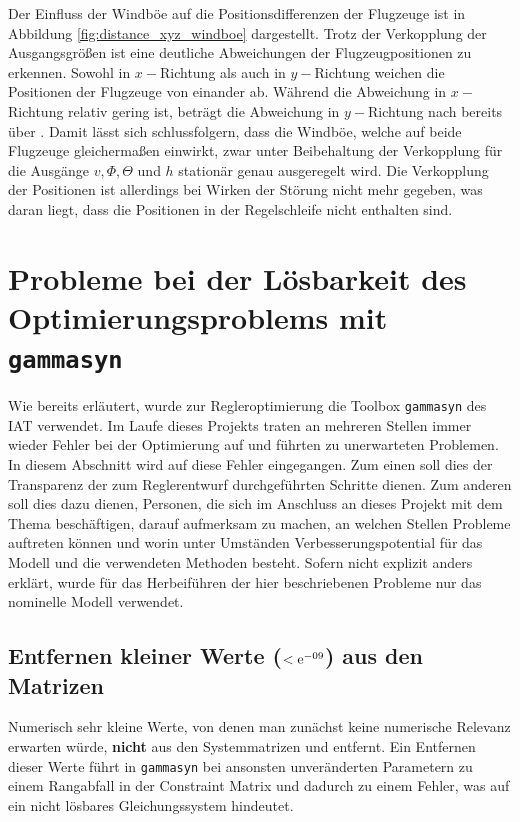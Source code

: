 Der Einfluss der Windböe auf die Positionsdifferenzen der Flugzeuge ist in Abbildung \ref{fig:distance_xyz_windboe} dargestellt. Trotz der Verkopplung der Ausgangsgrößen ist eine deutliche Abweichungen der Flugzeugpositionen zu erkennen. Sowohl in $x-$Richtung als auch in $y-$Richtung weichen die Positionen der Flugzeuge von einander ab. Während die Abweichung in $x-$Richtung relativ gering ist, beträgt die Abweichung in $y-$Richtung nach  bereits über . Damit lässt sich schlussfolgern, dass die Windböe, welche auf beide Flugzeuge gleichermaßen einwirkt, zwar unter Beibehaltung der Verkopplung für die Ausgänge $v, \Phi, \Theta$ und $h$ stationär genau ausgeregelt wird. Die Verkopplung der Positionen ist allerdings bei Wirken der Störung nicht mehr gegeben, was daran liegt, dass die Positionen in der Regelschleife nicht enthalten sind.

\section{Probleme bei der Lösbarkeit des Optimierungsproblems mit \texttt{gammasyn}}
Wie bereits erläutert, wurde zur Regleroptimierung die \Matlab Toolbox \texttt{gammasyn} des IAT verwendet. Im Laufe dieses Projekts traten an mehreren Stellen immer wieder Fehler bei der Optimierung auf und führten zu unerwarteten Problemen. In diesem Abschnitt wird auf diese Fehler eingegangen. Zum einen soll dies der Transparenz der zum Reglerentwurf durchgeführten Schritte dienen. Zum anderen soll dies dazu dienen, Personen, die sich im Anschluss an dieses Projekt mit dem Thema beschäftigen, darauf aufmerksam zu machen, an welchen Stellen Probleme auftreten können und worin unter Umständen Verbesserungspotential für das Modell und die verwendeten Methoden besteht. Sofern nicht explizit anders erklärt, wurde für das Herbeiführen der hier beschriebenen Probleme nur das nominelle Modell verwendet.

\subsection{Entfernen kleiner Werte ($<\mathrm{e}^{-09}$) aus den Matrizen}
Numerisch sehr kleine Werte, von denen man zunächst keine numerische Relevanz erwarten würde, \textbf{nicht} aus den Systemmatrizen  und  entfernt. Ein Entfernen dieser Werte führt in \texttt{gammasyn} bei ansonsten unveränderten Parametern zu einem Rangabfall in der Constraint Matrix und dadurch zu einem Fehler, was auf ein nicht lösbares Gleichungssystem hindeutet. 

